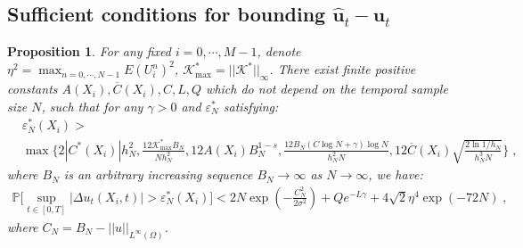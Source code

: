 \documentclass[a4paper,11pt]{article}
\newcommand{\bu}{\mathbf{u}}
\newtheorem{prop}{Proposition}[section]
\theoremstyle{definition}
\begin{document}
\subsection{Sufficient conditions for bounding $\widehat{\bu}_t-\bu_t$}
\begin{prop}\label{prop.Deltat}
For any fixed $i=0,\cdots,M-1$, denote $\eta^2 = \max_{n=0,\cdots,N-1}E(U_i^n)^2$, $\mathcal{K}^*_{\max}=||\mathcal{K}^*||_\infty$. There exist finite positive constants $A(X_i),\overline{C}(X_i),C,L,Q$ which do not depend on the temporal sample size $N$, such that for any $\gamma>0$ and $\varepsilon_N^*$ satisfying:
\begin{align*}
&\varepsilon_N^*(X_i)>\\
&\max\{2|C^*(X_i)|h_N^2,\frac{12\mathcal{K}^*_{\max}B_N}{Nh_N^2},12A(X_i)B_N^{1-s},\frac{12B_N(C\log N+\gamma)\log N}{h_N^2N},12\overline{C}(X_i)\sqrt{\frac{2\ln1/h_N}{h_N^3N}}\}\;,	
\end{align*}
where $B_N$ is an arbitrary increasing sequence $B_N\to\infty$ as $N\to\infty$, we have:
\begin{align}
\mathbb{P}\Big[\sup_{t\in[0,T]}|\Delta u_t(X_i,t)|>\varepsilon_N^*(X_i)\Big]<2N \exp(-\frac{C_N^2}{2\sigma^2})+Qe^{-L\gamma}+4\sqrt{2}\eta^4\exp(-72N)\;,\label{eq.boundDut}
\end{align}
where $C_N =B_N-||u||_{L^\infty(\Omega)}$.
\end{prop}
\end{document}
